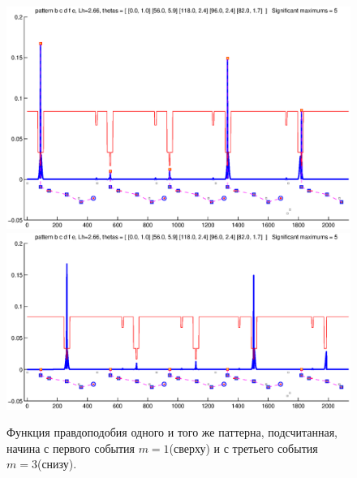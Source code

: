 \documentclass[12pt,fсeqn]{article}
\begin{document}
\begin{figure}[!b]
  \begin{center}
   \includegraphics[width=143mm]{pat1.eps}
   \\
   \includegraphics[width=143mm]{pat2.eps}
   \end{center}
\caption{Функция правдоподобия одного и того же паттерна, подсчитанная, начина с первого события $m=1$(сверху) и с
третьего события $m=3$(снизу).}
\label{fig:lhshift}
\end{figure}
\end{document}
